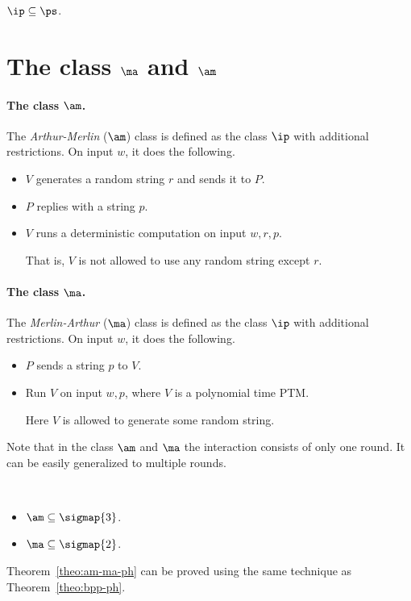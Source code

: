 \documentclass[11pt, a4paper]{article}
\begin{document}
\begin{lemma}
\label{lem:ip-ps}
$\ip\subseteq \ps$.
\end{lemma}


\section{The class $\ma$ and $\am$}

\paragraph*{The class $\am$.}
The {\em Arthur-Merlin} ($\am$) class is defined as the class $\ip$
with additional restrictions.
On input $w$, it does the following.
\begin{itemize}
\item
$V$ generates a random string $r$ and sends it to $P$.
\item 
$P$ replies with a string $p$.
\item 
$V$ runs a deterministic computation on input $w,r,p$.

That is, $V$ is not allowed to use any random string except $r$.
\end{itemize}


\paragraph*{The class $\ma$.}
The {\em Merlin-Arthur} ($\ma$) class is defined as the class $\ip$
with additional restrictions.
On input $w$, it does the following.
\begin{itemize}
\item 
$P$ sends a string $p$ to $V$.
\item 
Run $V$ on input $w,p$, where $V$ is a polynomial time PTM.

Here $V$ is allowed to generate some random string.
\end{itemize}

Note that in the class $\am$ and $\ma$ the interaction consists of only one round.
It can be easily generalized to multiple rounds.



\begin{theorem}
\label{theo:am-ma-ph}~
\begin{itemize}
\item 
$\am\subseteq \sigmap {3}$.
\item
$\ma\subseteq \sigmap {2}$.
\end{itemize}
\end{theorem}

Theorem~\ref{theo:am-ma-ph} can be proved using the same technique as Theorem~\ref{theo:bpp-ph}.
\end{document}

